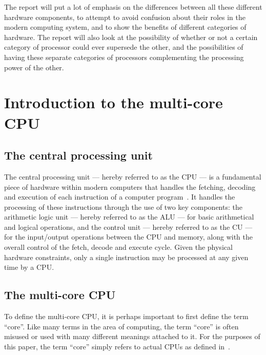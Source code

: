 \documentclass[a4paper,11pt]{article}
\begin{document}
The report will put a lot of emphasis on the differences between all these different hardware components, to attempt to
avoid confusion about their roles in the modern computing system, and to show the benefits of different categories of
hardware. The report will also look at the possibility of whether or not a certain category of processor could ever
supersede the other, and the possibilities of having these separate categories of processors complementing the
processing power of the other.


\newpage


\section{Introduction to the multi-core CPU} %
\label{sec:introduction_to_the_multi_core_cpu}

\subsection{The central processing unit} %
\label{sub:the_central_processing_unit}
The central processing unit --- hereby referred to as the CPU --- is a fundamental piece of hardware within modern computers that handles
the fetching, decoding and execution of each instruction of a computer program~\cite{web:CPUWiki}. It handles the processing
of these instructions through the use of two key components: the arithmetic logic unit --- hereby referred to as the ALU
--- for basic arithmetical and logical operations, and the control unit --- hereby referred to as the CU --- for the input/output
operations between the CPU and memory, along with the overall control of the fetch, decode and execute cycle. Given the
physical hardware constraints, only a single instruction may be processed at any given time by a CPU.

\subsection{The multi-core CPU} %
\label{sub:the_multi_core_cpu}
To define the multi-core CPU, it is perhaps important to first define the term ``core''. Like many terms in the area of computing,
the term ``core'' is often misused or used with many different meanings attached to it. For the purposes of this paper, the
term ``core'' simply refers to actual CPUs as defined in~.
\end{document}
